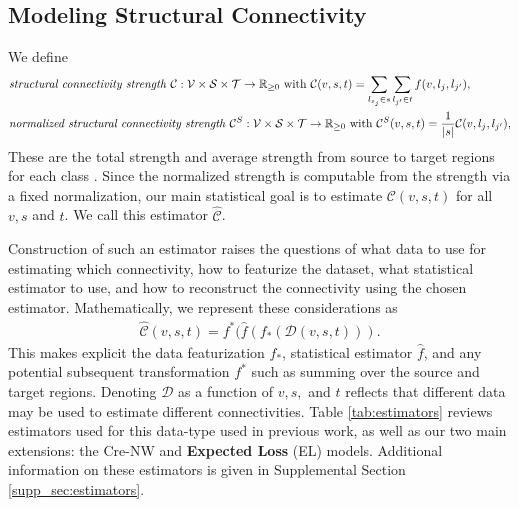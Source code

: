\newpage

\subsection{Modeling Structural Connectivity}
We define
\begin{align*}
&\text{\textit {structural connectivity strength} } \mathcal C : \mathcal V \times \mathcal S \times \mathcal T \to \mathbb R_{\geq 0}  \text{ with } \mathcal C(v,s,t) = \sum_{l_{s_j} \in s} \sum_{l_{j'} \in  t} f(v,l_{j},l_{j'}), \\
&\text{\textit {normalized structural connectivity strength} } \mathcal C^S : \mathcal V \times \mathcal S \times \mathcal T \to \mathbb R_{\geq 0}  \text{ with } \mathcal C^S(v,s,t) = \frac{1}{|s|} \mathcal C(v,l_{j},l_{j'}), \\
\end{align*}
These are the total strength and average strength from source to target regions for each class .
Since the normalized strength is computable from the strength via a fixed normalization, our main statistical goal is to estimate $\mathcal C (v,s,t) $ for all $v, s$ and $t$.%
We call this estimator $\widehat { \mathcal C } $.

Construction of such an estimator raises the questions of what data to use for estimating which connectivity, how to featurize the dataset, what statistical estimator to use, and how to reconstruct the connectivity using the chosen estimator.
Mathematically, we represent these considerations as 
\begin{align}
\label{eq:estimator}
\widehat { \mathcal C }(v,s,t) = f^* (\widehat f (f_*( \mathcal D(v,s,t))).
\end{align}
This makes explicit the data featurization $f_{*}$, statistical estimator $\widehat f$, and any potential subsequent transformation $f^*$ such as summing over the source and target regions.
Denoting $ \mathcal D$ as a function of $v,s,$ and $t$ reflects that different data may be used to estimate different connectivities.
Table \ref{tab:estimators} reviews estimators used for this data-type used in previous work, as well as our two main extensions: the Cre-NW and \textbf{Expected Loss} (EL) models.
Additional information on these estimators is given in Supplemental Section \ref{supp_sec:estimators}.

